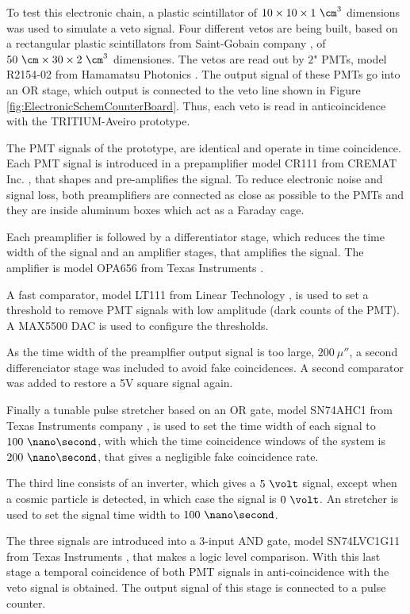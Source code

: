 \begin{enumerate}
To test this electronic chain, a plastic scintillator of $10 \times 10 \times 1~\cm^3$ dimensions was used to simulate a veto signal. Four different vetos are being built, based on a rectangular plastic scintillators from Saint-Gobain company \cite{VetoAveiro}, of $50~\cm \times 30 \times 2~\cm^3$ dimensiones. The vetos are read out by $2$" PMTs, model R2154-02 from Hamamatsu Photonics \cite{DataSheetPMTsAveiro}. The output signal of these PMTs go into an OR stage, which output is connected to the veto line shown in Figure \ref{fig:ElectronicSchemCounterBoard}. Thus, each veto is read in anticoincidence with the TRITIUM-Aveiro prototype.

The PMT signals of the prototype, are identical and operate in time coincidence. Each PMT signal is introduced in a prepamplifier model CR111 from CREMAT Inc. \cite{CREMATPreAmplifierDataSheet}, that shapes and pre-amplifies the signal. To reduce electronic noise and signal loss, both preamplifiers are connected as close as possible to the PMTs and they are inside aluminum boxes which act as a Faraday cage.

Each preamplifier is followed by a differentiator stage, which reduces the time width of the signal and an amplifier stages, that amplifies the signal. The amplifier is model OPA656 from Texas Instruments \cite{OPA656}. 

A fast comparator, model LT111 from Linear Technology \cite{LT111}, is used to set a threshold to remove PMT signals with low amplitude (dark counts of the PMT). A MAX5500 DAC is used to configure the thresholds.

As the time width of the preamplfier output signal is too large, $200~\mu\second$, a second differenciator stage was included to avoid fake coincidences. A second comparator was added to restore a 5V square signal again.

Finally a tunable pulse stretcher based on an OR gate, model SN74AHC1 from Texas Instruments company \cite{Stretcher}, is used to set the time width of each signal to $100~\nano\second$, with which the time coincidence windows of the system is $200~\nano\second$, that gives a negligible fake coincidence rate.

The third line consists of an inverter, which gives a $5~\volt$ signal, except when a cosmic particle is detected, in which case the signal is $0~\volt$. An stretcher is used to set the signal time width to $100~\nano\second$.

The three signals are introduced into a 3-input AND gate, model SN74LVC1G11 from Texas Instruments \cite{ANDGate}, that makes a logic level comparison. With this last stage a temporal coincidence of both PMT signals in anti-coincidence with the veto signal is obtained. The output signal of this stage is connected to a pulse counter. 


\end{enumerate}
